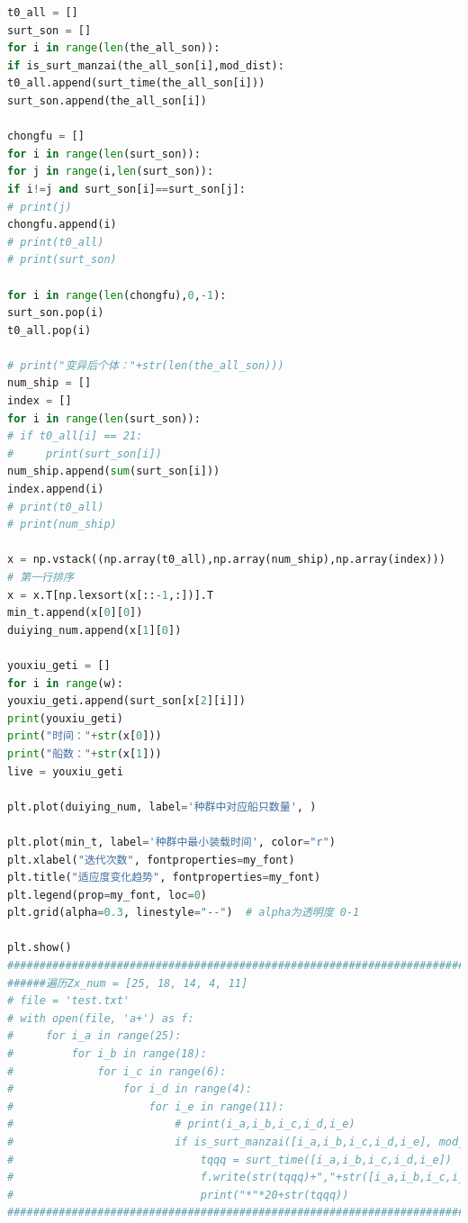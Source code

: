 \documentclass{whutmod}
\begin{document}
\begin{lstlisting}[language=python]
t0_all = []
surt_son = []
for i in range(len(the_all_son)):
if is_surt_manzai(the_all_son[i],mod_dist):
t0_all.append(surt_time(the_all_son[i]))
surt_son.append(the_all_son[i])

chongfu = []
for i in range(len(surt_son)):
for j in range(i,len(surt_son)):
if i!=j and surt_son[i]==surt_son[j]:
# print(j)
chongfu.append(i)
# print(t0_all)
# print(surt_son)

for i in range(len(chongfu),0,-1):
surt_son.pop(i)
t0_all.pop(i)

# print("变异后个体："+str(len(the_all_son)))
num_ship = []
index = []
for i in range(len(surt_son)):
# if t0_all[i] == 21:
#     print(surt_son[i])
num_ship.append(sum(surt_son[i]))
index.append(i)
# print(t0_all)
# print(num_ship)

x = np.vstack((np.array(t0_all),np.array(num_ship),np.array(index)))
# 第一行排序
x = x.T[np.lexsort(x[::-1,:])].T
min_t.append(x[0][0])
duiying_num.append(x[1][0])

youxiu_geti = []
for i in range(w):
youxiu_geti.append(surt_son[x[2][i]])
print(youxiu_geti)
print("时间："+str(x[0]))
print("船数："+str(x[1]))
live = youxiu_geti

plt.plot(duiying_num, label='种群中对应船只数量', )

plt.plot(min_t, label='种群中最小装载时间', color="r")
plt.xlabel("迭代次数", fontproperties=my_font)
plt.title("适应度变化趋势", fontproperties=my_font)
plt.legend(prop=my_font, loc=0)
plt.grid(alpha=0.3, linestyle="--")  # alpha为透明度 0-1

plt.show()
#############################################################################################################################
######遍历Zx_num = [25, 18, 14, 4, 11]
# file = 'test.txt'
# with open(file, 'a+') as f:
#     for i_a in range(25):
#         for i_b in range(18):
#             for i_c in range(6):
#                 for i_d in range(4):
#                     for i_e in range(11):
#                         # print(i_a,i_b,i_c,i_d,i_e)
#                         if is_surt_manzai([i_a,i_b,i_c,i_d,i_e], mod_dist):
#                             tqqq = surt_time([i_a,i_b,i_c,i_d,i_e])
#                             f.write(str(tqqq)+","+str([i_a,i_b,i_c,i_d,i_e])+","+str(sum([i_a,i_b,i_c,i_d,i_e]))+"\n")
#                             print("*"*20+str(tqqq))
#############################################################################################################################


\end{lstlisting}
\end{document}
